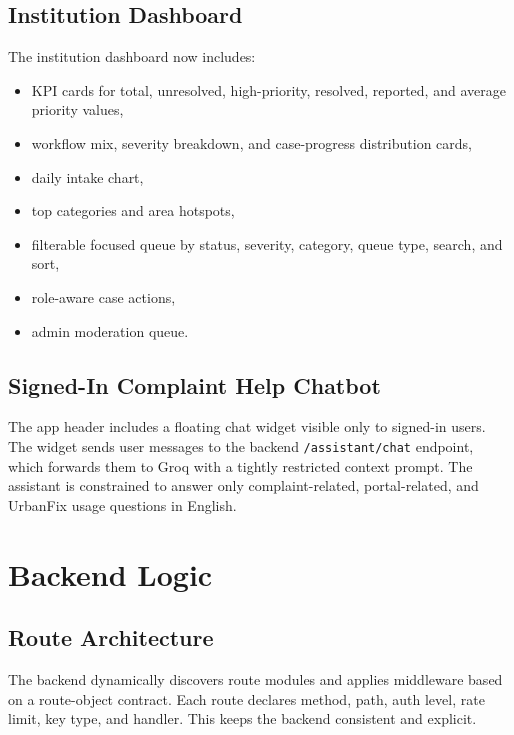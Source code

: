 \documentclass[12pt,a4paper]{report}
\begin{document}
\subsection{Institution Dashboard}
The institution dashboard now includes:
\begin{itemize}
  \item KPI cards for total, unresolved, high-priority, resolved, reported, and average priority values,
  \item workflow mix, severity breakdown, and case-progress distribution cards,
  \item daily intake chart,
  \item top categories and area hotspots,
  \item filterable focused queue by status, severity, category, queue type, search, and sort,
  \item role-aware case actions,
  \item admin moderation queue.
\end{itemize}

\subsection{Signed-In Complaint Help Chatbot}
The app header includes a floating chat widget visible only to signed-in users. The widget sends user messages to the backend \texttt{/assistant/chat} endpoint, which forwards them to Groq with a tightly restricted context prompt. The assistant is constrained to answer only complaint-related, portal-related, and UrbanFix usage questions in English.

\section{Backend Logic}
\subsection{Route Architecture}
The backend dynamically discovers route modules and applies middleware based on a route-object contract. Each route declares method, path, auth level, rate limit, key type, and handler. This keeps the backend consistent and explicit.
\end{document}
